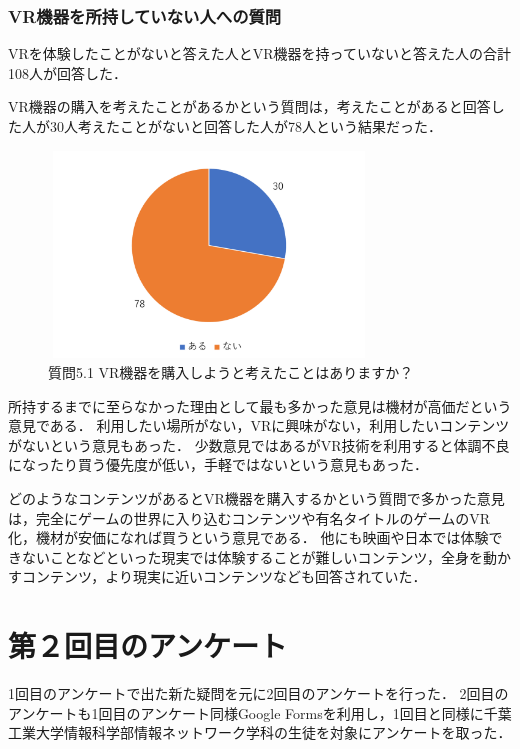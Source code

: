 \documentclass[12pt,a4j]{ltjsarticle}
\begin{document}
\subsubsection{VR機器を所持していない人への質問}
VRを体験したことがないと答えた人とVR機器を持っていないと答えた人の合計108人が回答した．

VR機器の購入を考えたことがあるかという質問は，考えたことがあると回答した人が30人考えたことがないと回答した人が78人という結果だった．

\begin{figure}[h]
\begin{center}
 \includegraphics[clip,width=85mm,height=55mm]{アンケート結果1_5_1.pdf}
\end{center}
 \caption{質問5.1 VR機器を購入しようと考えたことはありますか？}
 \label{fig:アンケート結果1_5_1.pdf}
\end{figure}

所持するまでに至らなかった理由として最も多かった意見は機材が高価だという意見である．
利用したい場所がない，VRに興味がない，利用したいコンテンツがないという意見もあった．
少数意見ではあるがVR技術を利用すると体調不良になったり買う優先度が低い，手軽ではないという意見もあった．

どのようなコンテンツがあるとVR機器を購入するかという質問で多かった意見は，完全にゲームの世界に入り込むコンテンツや有名タイトルのゲームのVR化，機材が安価になれば買うという意見である．
他にも映画や日本では体験できないことなどといった現実では体験することが難しいコンテンツ，全身を動かすコンテンツ，より現実に近いコンテンツなども回答されていた．
\clearpage

\section{第２回目のアンケート}
1回目のアンケートで出た新た疑問を元に2回目のアンケートを行った．
2回目のアンケートも1回目のアンケート同様Google Formsを利用し，1回目と同様に千葉工業大学情報科学部情報ネットワーク学科の生徒を対象にアンケートを取った．
\end{document}
